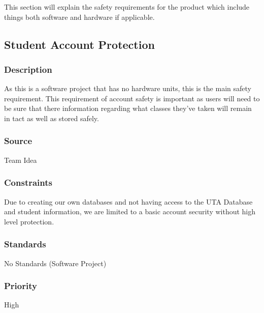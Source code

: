 This section will explain the safety requirements for the product which include things both software and hardware if applicable.\\
\subsection{Student Account Protection}
\subsubsection{Description}
As this is a software project that has no hardware units, this is the main safety requirement. This requirement of account safety is important as users will need to be sure that there information regarding what classes they've taken will remain in tact as well as stored safely.
\subsubsection{Source}
Team Idea
\subsubsection{Constraints}
Due to creating our own databases and not having access to the UTA Database and student information, we are limited to a basic account security without high level protection.
\subsubsection{Standards}
No Standards (Software Project)
\subsubsection{Priority}
High
